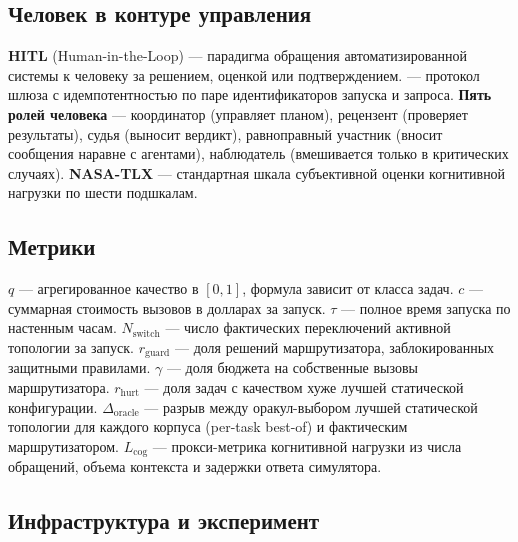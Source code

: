 \subsection*{Человек в контуре управления}

\noindent\textbf{HITL} (Human-in-the-Loop) --- парадигма
обращения автоматизированной системы к человеку за решением,
оценкой или подтверждением.\quad
\textbf{} --- протокол шлюза с идемпотентностью
по паре идентификаторов запуска и запроса.\quad
\textbf{Пять ролей человека} --- координатор (управляет планом),
рецензент (проверяет результаты), судья (выносит вердикт),
равноправный участник (вносит сообщения наравне с агентами),
наблюдатель (вмешивается только в критических случаях).\quad
\textbf{NASA-TLX} --- стандартная шкала субъективной оценки
когнитивной нагрузки по шести подшкалам.

\subsection*{Метрики}

\noindent\textbf{$q$} --- агрегированное качество в $[0, 1]$,
формула зависит от класса задач.\quad
\textbf{$c$} --- суммарная стоимость вызовов в долларах за
запуск.\quad
\textbf{$\tau$} --- полное время запуска по настенным часам.\quad
\textbf{$N_{\text{switch}}$} --- число фактических переключений
активной топологии за запуск.\quad
\textbf{$r_{\text{guard}}$} --- доля решений маршрутизатора,
заблокированных защитными правилами.\quad
\textbf{$\gamma$} --- доля бюджета на собственные вызовы
маршрутизатора.\quad
\textbf{$r_{\text{hurt}}$} --- доля задач с качеством хуже
лучшей статической конфигурации.\quad
\textbf{$\Delta_{\text{oracle}}$} --- разрыв между
оракул-выбором лучшей статической топологии для каждого
корпуса (per-task best-of) и фактическим маршрутизатором.\quad
\textbf{$L_{\text{cog}}$} --- прокси-метрика когнитивной
нагрузки из числа обращений, объема контекста и задержки
ответа симулятора.

\subsection*{Инфраструктура и эксперимент}


